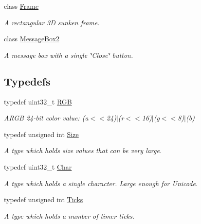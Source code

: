 \begin{DoxyCompactItemize}
class \hyperlink{classGUI_1_1Frame}{Frame}
\begin{DoxyCompactList}\small\item\em A rectangular 3\-D sunken frame. \end{DoxyCompactList}\item 
class \hyperlink{classGUI_1_1MessageBox2}{Message\-Box2}
\begin{DoxyCompactList}\small\item\em A message box with a single \char`\"{}\-Close\char`\"{} button. \end{DoxyCompactList}\end{DoxyCompactItemize}
\subsection*{Typedefs}
\begin{DoxyCompactItemize}
\item 
\hypertarget{namespaceGUI_aeafd135255365f3584da0e982fc79466}{typedef uint32\-\_\-t \hyperlink{namespaceGUI_aeafd135255365f3584da0e982fc79466}{R\-G\-B}}\label{namespaceGUI_aeafd135255365f3584da0e982fc79466}

\begin{DoxyCompactList}\small\item\em A\-R\-G\-B 24-\/bit color value\-: (a$<$$<$24)$|$(r$<$$<$16)$|$(g$<$$<$8)$|$(b) \end{DoxyCompactList}\item 
\hypertarget{namespaceGUI_a10b6232e08729baa0bd211a86a69ce36}{typedef unsigned int \hyperlink{namespaceGUI_a10b6232e08729baa0bd211a86a69ce36}{Size}}\label{namespaceGUI_a10b6232e08729baa0bd211a86a69ce36}

\begin{DoxyCompactList}\small\item\em A type which holds size values that can be very large. \end{DoxyCompactList}\item 
\hypertarget{namespaceGUI_af6b04b46d40197b4f00e553d7d1a3e4c}{typedef uint32\-\_\-t \hyperlink{namespaceGUI_af6b04b46d40197b4f00e553d7d1a3e4c}{Char}}\label{namespaceGUI_af6b04b46d40197b4f00e553d7d1a3e4c}

\begin{DoxyCompactList}\small\item\em A type which holds a single character. Large enough for Unicode. \end{DoxyCompactList}\item 
\hypertarget{namespaceGUI_af396fee5d5c26b98218f5803f85e3b65}{typedef unsigned int \hyperlink{namespaceGUI_af396fee5d5c26b98218f5803f85e3b65}{Ticks}}\label{namespaceGUI_af396fee5d5c26b98218f5803f85e3b65}

\begin{DoxyCompactList}\small\item\em A type which holds a number of timer ticks. \end{DoxyCompactList}\end{DoxyCompactItemize}

